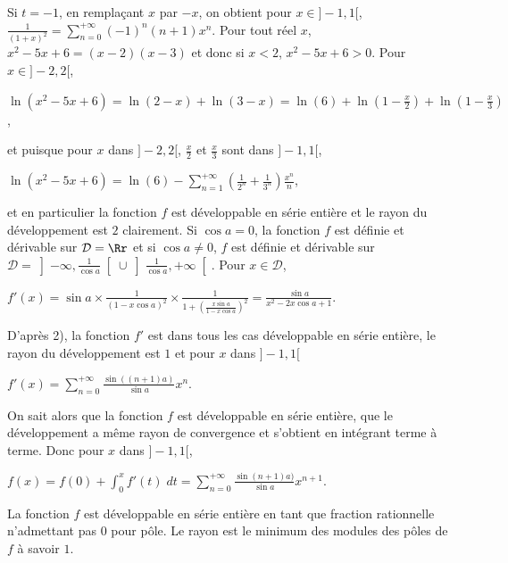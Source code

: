 {{Si $t = -1$, en remplaçant $x$ par $-x$,  on obtient pour $x\in]-1,1[$, $\frac{1}{(1+x)^2}=\sum_{n=0}^{+\infty}(-1)^n(n+1)x^n$.
Pour tout réel $x$, $x^2 -5x+6=(x-2)(x-3)$ et donc si $x < 2$, $x^2-5x+6>0$. Pour $x\in ]-2,2[$,

\begin{center}
$\ln(x^2-5x+6)=\ln(2-x)+\ln(3-x)=\ln(6)+\ln\left(1-\frac{x}{2}\right)+\ln\left(1-\frac{x}{3}\right)$,
\end{center}

et puisque pour $x$ dans $]-2,2[$, $\frac{x}{2}$ et $\frac{x}{3}$ sont dans $]-1,1[$, 

\begin{center}
$\ln(x^2-5x+6)=\ln(6)-\sum_{n=1}^{+\infty}\left(\frac{1}{2^n}+\frac {1}{3^n}\right)\frac{x^n}{n}$,
\end{center}

et en particulier la fonction $f$ est développable en série entière et le rayon du développement est $2$ clairement.
Si $\cos a = 0$, la fonction $f$ est définie et dérivable sur $\mathcal{D}=\Rr$ et si $\cos a\neq 0$, $f$ est définie et dérivable sur $\mathcal{D}=\left]-\infty,\frac{1}{\cos a}\right[\cup\left]\frac{1}{\cos a},+\infty\right[$. Pour $x\in\mathcal{D}$, 

\begin{center}
$f'(x) =\sin a\times\frac{1}{(1-x\cos a)^2}\times\frac{1}{1+\left(\frac{x\sin a}{1-x\cos a}\right)^2}=\frac{\sin a}{x^2-2x\cos a+1}$.
\end{center}

D'après 2), la fonction $f'$ est dans tous les cas développable en série entière, le rayon du développement est $1$ et pour $x$ dans $]-1,1[$

\begin{center}
$f'(x) =\sum_{n=0}^{+\infty}\frac{\sin((n+1)a)}{\sin a}x^n$.
\end{center}

On sait alors que la fonction $f$ est développable en série entière, que le développement a même rayon de convergence et s'obtient en intégrant terme à terme. Donc pour $x$ dans $]-1,1[$,

\begin{center}
$f(x)= f(0)+\int_{0}^{x}f'(t)\;dt=\sum_{n=0}^{+\infty}\frac{\sin(n+1)a)}{\sin a}x^{n+1}$.
\end{center}
La fonction $f$ est développable en série entière en tant que fraction rationnelle n'admettant pas $0$ pour pôle. Le rayon est le minimum des modules des pôles de $f$ à savoir $1$.

}}

